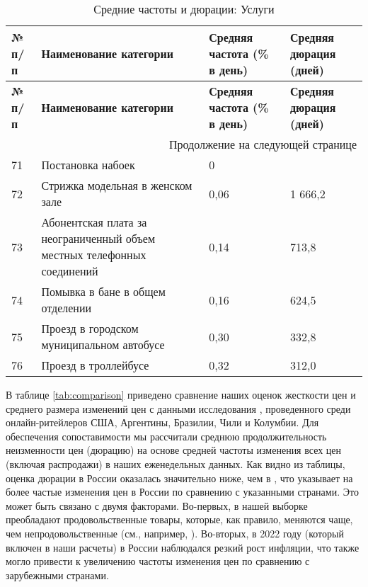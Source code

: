 \begin{longtable}{|p{1cm}|p{8.5cm}|p{3.5cm}|p{3cm}|} %
	\caption{Средние частоты и дюрации: Услуги}
	\label{tab:services} \\
	\hline
	\textbf{№ п/п} & \textbf{Наименование категории} & \textbf{Средняя частота (\% в день)} & \textbf{Средняя дюрация (дней)} \\
	\hline
	\hline
	\endfirsthead
	
	\hline
	\textbf{№ п/п} & \textbf{Наименование категории} & \textbf{Средняя частота (\% в день)} & \textbf{Средняя дюрация (дней)} \\
	\hline
	\hline
	\endhead
	
	\hline
	\multicolumn{4}{r}{Продолжение на следующей странице} \\
	\hline
	\endfoot
	
	\hline
	\endlastfoot
	
	71 & Постановка набоек & 0 &  \\ \hline
	72 & Стрижка модельная в женском зале & 0,06 & 1 666,2 \\ \hline
	73 & Абонентская плата за неограниченный объем местных телефонных соединений & 0,14 & 713,8 \\ \hline
	74 & Помывка в бане в общем отделении & 0,16 & 624,5 \\ \hline
	75 & Проезд в городском муниципальном автобусе & 0,30 & 332,8 \\ \hline
	76 & Проезд в троллейбусе & 0,32 & 312,0 \\ \hline
	
\end{longtable}

В таблице \ref{tab:comparison} приведено сравнение наших оценок жесткости цен и среднего размера изменений цен с данными исследования \cite{cavallo2018scraped}, проведенного среди онлайн-ритейлеров США, Аргентины, Бразилии, Чили и Колумбии. Для обеспечения сопоставимости мы рассчитали среднюю продолжительность неизменности цен (дюрацию) на основе средней частоты изменения всех цен (включая распродажи) в наших еженедельных данных. Как видно из таблицы, оценка дюрации в России оказалась значительно ниже, чем в \cite{cavallo2018scraped}, что указывает на более частые изменения цен в России по сравнению с указанными странами. Это может быть связано с двумя факторами. Во-первых, в нашей выборке преобладают продовольственные товары, которые, как правило, меняются чаще, чем непродовольственные (см., например, \cite{bils2004some}). Во-вторых, в 2022 году (который включен в наши расчеты) в России наблюдался резкий рост инфляции, что также могло привести к увеличению частоты изменения цен по сравнению с зарубежными странами.

